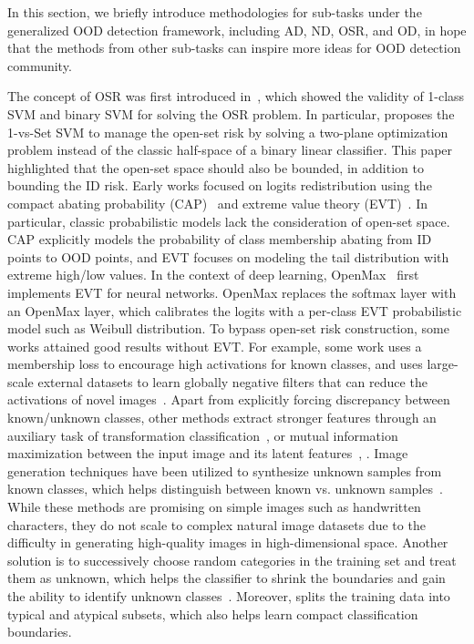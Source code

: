 \label{sec:others}
In this section, we briefly introduce methodologies for sub-tasks under the generalized OOD detection framework, including AD, ND, OSR, and OD, in hope that the methods from other sub-tasks can inspire more ideas for OOD detection community.

\label{sec:osr}
The concept of OSR was first introduced in~, which showed the validity of 1-class SVM and binary SVM for solving the OSR problem. In particular,  proposes the 1-vs-Set SVM to manage the open-set risk by solving a two-plane optimization problem instead of the classic half-space of a binary linear classifier. This paper highlighted that the open-set space should also be bounded, in addition to bounding the ID risk.
\smallskip
{}
\label{sec:osr_classification}
Early works focused on logits redistribution using the compact abating probability (CAP)~ and extreme value theory (EVT)~.
In particular, classic probabilistic models lack the consideration of open-set space. CAP explicitly models the probability of class membership abating from ID points to OOD points, and EVT focuses on modeling the tail distribution with extreme high/low values.
In the context of deep learning, OpenMax~ first implements EVT for neural networks. OpenMax replaces the softmax layer with an OpenMax layer, which calibrates the logits with a per-class EVT probabilistic model such as Weibull distribution.
To bypass open-set risk construction, some works attained good results without EVT. For example, some work uses a membership loss to encourage high activations for known classes, and uses large-scale external datasets to learn globally negative filters that can reduce the activations of novel images~.
Apart from explicitly forcing discrepancy between known/unknown classes, 
other methods extract stronger features through an auxiliary task of transformation classification~, or mutual information maximization between the input image and its latent features~, \etc.
Image generation techniques have been utilized to synthesize unknown samples from known classes, which helps distinguish between known vs. unknown samples~.
While these methods are promising on simple images such as handwritten characters, they do not scale to complex natural image datasets due to the difficulty in generating high-quality images in high-dimensional space.
Another solution is to successively choose random categories in the training set and treat them as unknown, which helps the classifier to shrink the boundaries and gain the ability to identify unknown classes~.
Moreover,  splits the training data into typical and atypical subsets, which also helps learn compact classification boundaries.
